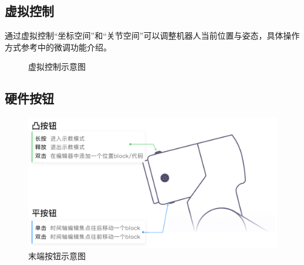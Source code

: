 \subsection{虚拟控制}
通过虚拟控制“坐标空间”和“关节空间”可以调整机器人当前位置与姿态，具体操作方式参考中的微调功能介绍。

\begin{figure}[ht]
	\centering
	\color{red}{缺图}
	\caption{虚拟控制示意图}
	\label{fig:虚拟控制示意图}
\end{figure}

\subsection{硬件按钮}

\begin{figure}[ht]
	\centering
	\includegraphics[width=\textwidth]{image/40.pdf}
	\caption{末端按钮示意图}
	\label{fig:末端按钮示意图}
\end{figure}

